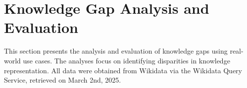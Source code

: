 \section{Knowledge Gap Analysis and Evaluation}


This section presents the analysis and evaluation of knowledge gaps using real-world use cases. The analyses focus on identifying disparities in knowledge representation. All data were obtained from Wikidata via the Wikidata Query Service, retrieved on March 2nd, 2025.












